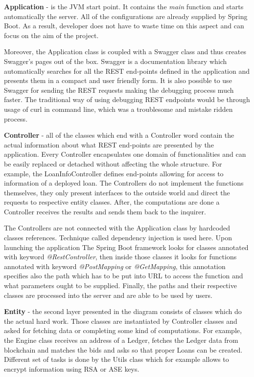 \documentclass[a4paper,12pt,twoside,openany]{report}
\begin{document}
\textbf{Application} - is the JVM start point. It contains the \textit{main} function and starts automatically the server. All of the configurations are already supplied by Spring Boot. As a result, developer does not have to waste time on this aspect and can focus on the aim of the project. 

Moreover, the Application class is coupled with a Swagger class and thus creates Swagger's pages out of the box. Swagger is a documentation library which automatically searches for all the REST end-points defined in the application and presents them in a compact and user friendly form. It is also possible to use Swagger for sending the REST requests making the debugging process much faster. The traditional way of using debugging REST endpoints would be through usage of curl in command line, which was a troublesome and mistake ridden process.

\textbf{Controller} - all of the classes which end with a Controller word contain the actual information about what REST end-points are presented by the application. Every Controller encapsulates one domain of functionalities and can be easily replaced or detached without affecting the whole structure. For example, the LoanInfoController defines end-points allowing for access to information of a deployed loan. The Controllers do not implement the functions themselves, they only present interfaces to the outside world and direct the requests to respective entity classes. After, the computations are done a Controller receives the results and sends them back to the inquirer. 

The Controllers are not connected with the Application class by hardcoded classes references. Technique called dependency injection is used here. Upon launching the application The Spring Boot framework looks for classes annotated with keyword \textit{@RestController}, then inside those classes it looks for functions annotated with keyword \textit{@PostMapping} or \textit{@GetMapping}, this annotation specifies also the path which has to be put into URL to access the function and what parameters ought to be supplied. Finally, the paths and their respective classes are processed into the server and are able to be used by users.

\textbf{Entity} - the second layer presented in the diagram consists of classes which do the actual hard work. Those classes are instantiated by Controller classes and asked for fetching data or completing some kind of computations. For example, the Engine class receives an address of a Ledger, fetches the Ledger data from blockchain and matches the bids and asks so that proper Loans can be created. Different set of tasks is done by the Utils class which for example allows to encrypt information using RSA or ASE keys.
\end{document}
